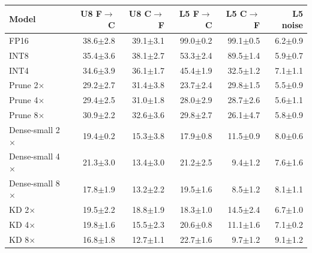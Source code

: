 \begin{tabular}{lrrrrr}
\toprule
Model & U8 F$\to$C & U8 C$\to$F & L5 F$\to$C & L5 C$\to$F & L5 noise \\
\midrule
FP16 & 38.6{\scriptsize$\pm$2.8} & 39.1{\scriptsize$\pm$3.1} & 99.0{\scriptsize$\pm$0.2} & 99.1{\scriptsize$\pm$0.5} & 6.2{\scriptsize$\pm$0.9} \\
INT8 & 35.4{\scriptsize$\pm$3.6} & 38.1{\scriptsize$\pm$2.7} & 53.3{\scriptsize$\pm$2.4} & 89.5{\scriptsize$\pm$1.4} & 5.9{\scriptsize$\pm$0.7} \\
INT4 & 34.6{\scriptsize$\pm$3.9} & 36.1{\scriptsize$\pm$1.7} & 45.4{\scriptsize$\pm$1.9} & 32.5{\scriptsize$\pm$1.2} & 7.1{\scriptsize$\pm$1.1} \\
\midrule
Prune 2$\times$ & 29.2{\scriptsize$\pm$2.7} & 31.4{\scriptsize$\pm$3.8} & 23.7{\scriptsize$\pm$2.4} & 29.8{\scriptsize$\pm$1.5} & 5.5{\scriptsize$\pm$0.9} \\
Prune 4$\times$ & 29.4{\scriptsize$\pm$2.5} & 31.0{\scriptsize$\pm$1.8} & 28.0{\scriptsize$\pm$2.9} & 28.7{\scriptsize$\pm$2.6} & 5.6{\scriptsize$\pm$1.1} \\
Prune 8$\times$ & 30.9{\scriptsize$\pm$2.2} & 32.6{\scriptsize$\pm$3.6} & 29.8{\scriptsize$\pm$2.7} & 26.1{\scriptsize$\pm$4.7} & 5.8{\scriptsize$\pm$0.9} \\
\midrule
Dense-small 2$\times$ & 19.4{\scriptsize$\pm$0.2} & 15.3{\scriptsize$\pm$3.8} & 17.9{\scriptsize$\pm$0.8} & 11.5{\scriptsize$\pm$0.9} & 8.0{\scriptsize$\pm$0.6} \\
Dense-small 4$\times$ & 21.3{\scriptsize$\pm$3.0} & 13.4{\scriptsize$\pm$3.0} & 21.2{\scriptsize$\pm$2.5} & 9.4{\scriptsize$\pm$1.2} & 7.6{\scriptsize$\pm$1.6} \\
Dense-small 8$\times$ & 17.8{\scriptsize$\pm$1.9} & 13.2{\scriptsize$\pm$2.2} & 19.5{\scriptsize$\pm$1.6} & 8.5{\scriptsize$\pm$1.2} & 8.1{\scriptsize$\pm$1.1} \\
\midrule
KD 2$\times$ & 19.5{\scriptsize$\pm$2.2} & 18.8{\scriptsize$\pm$1.9} & 18.3{\scriptsize$\pm$1.0} & 14.5{\scriptsize$\pm$2.4} & 6.7{\scriptsize$\pm$1.0} \\
KD 4$\times$ & 19.8{\scriptsize$\pm$1.6} & 15.5{\scriptsize$\pm$2.3} & 20.6{\scriptsize$\pm$0.8} & 11.1{\scriptsize$\pm$1.6} & 7.1{\scriptsize$\pm$0.2} \\
KD 8$\times$ & 16.8{\scriptsize$\pm$1.8} & 12.7{\scriptsize$\pm$1.1} & 22.7{\scriptsize$\pm$1.6} & 9.7{\scriptsize$\pm$1.2} & 9.1{\scriptsize$\pm$1.2} \\
\bottomrule
\end{tabular}
